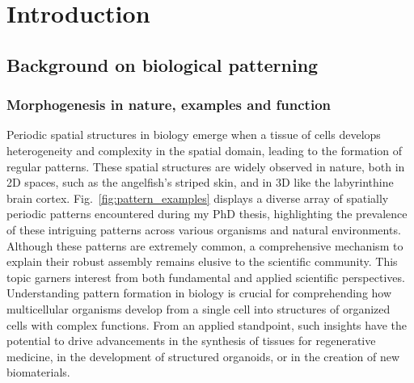 \chapter{Introduction}\label{introduction}
\section{Background on biological patterning}
\subsection{Morphogenesis in nature, examples and function}

Periodic spatial structures in biology emerge when a tissue of cells develops heterogeneity and complexity in the spatial domain, leading to the formation of regular patterns.
These spatial structures are widely observed in nature, both in  \acrfull{2D} spaces, such as the angelfish's striped skin, and in \acrfull{3D} like the labyrinthine brain cortex.
Fig.~\ref{fig:pattern_examples} displays a diverse array of spatially periodic patterns encountered during my PhD thesis, highlighting the prevalence of these intriguing patterns across various organisms and natural environments.
Although these patterns are extremely common, a comprehensive mechanism to explain their robust assembly remains elusive to the scientific community.
This topic garners interest from both fundamental and applied scientific perspectives.
Understanding pattern formation in biology is crucial for comprehending how multicellular organisms develop from a single cell into structures of organized cells with complex functions.
From an applied standpoint, such insights have the potential to drive advancements in the synthesis of tissues for regenerative medicine, in the development of structured organoids, or in the creation of new biomaterials.


